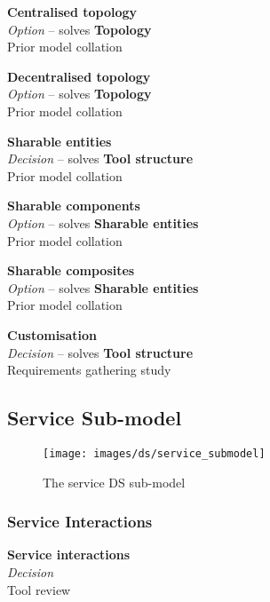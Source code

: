 \textbf{Centralised topology} \\ \emph{Option} -- solves \textbf{Topology} \\ Prior model collation \cite{Bronsted2010a}

\textbf{Decentralised topology} \\ \emph{Option} -- solves \textbf{Topology} \\ Prior model collation \cite{Bronsted2010a}

\textbf{Sharable entities} \\ \emph{Decision} -- solves \textbf{Tool structure} \\ Prior model collation \cite{Grammel2010}

\textbf{Sharable components} \\ \emph{Option} -- solves \textbf{Sharable entities} \\ Prior model collation \cite{Grammel2010}

\textbf{Sharable composites} \\ \emph{Option} -- solves \textbf{Sharable entities} \\ Prior model collation \cite{Grammel2010}

\textbf{Customisation} \\ \emph{Decision} -- solves \textbf{Tool structure} \\ Requirements gathering study

\subsection{Service Sub-model}

\begin{figure}[htb]
	\centering
	\texttt{[image: images/ds/service\_submodel]}
	\caption{The service DS sub-model}
	\label{ds:fig:service}
\end{figure}

\clearpage

\subsubsection{Service Interactions}


\textbf{Service interactions} \\ \emph{Decision} \\ Tool review

